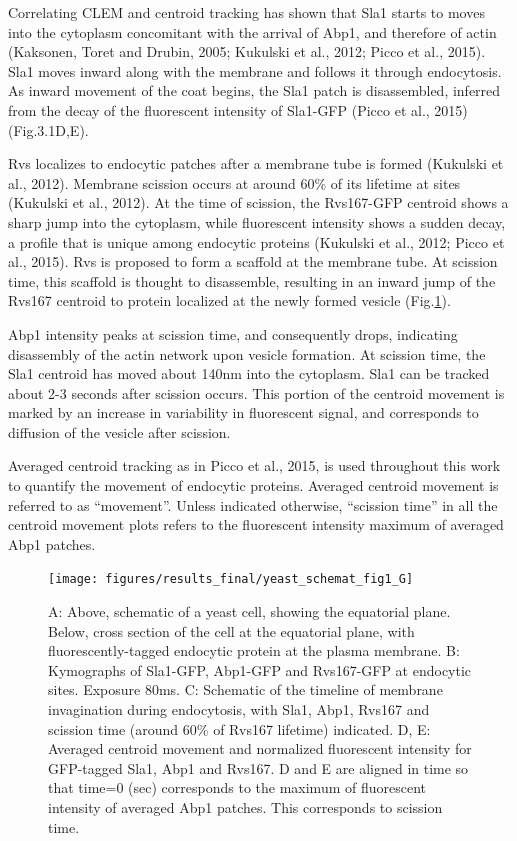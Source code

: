 \vspace{5mm}
Correlating CLEM and centroid tracking has shown that Sla1 starts to moves into the cytoplasm concomitant with the arrival of Abp1, and therefore of actin (Kaksonen, Toret and Drubin, 2005; Kukulski et al., 2012; Picco et al., 2015). Sla1 moves inward along with the membrane and follows it through endocytosis. As inward movement of the coat begins, the Sla1 patch is disassembled, inferred from the decay of the fluorescent intensity of Sla1-GFP (Picco et al., 2015) (Fig.3.1D,E). 

Rvs localizes to endocytic patches after a membrane tube is formed (Kukulski et al., 2012). Membrane scission occurs at around 60\% of its lifetime at sites (Kukulski et al., 2012). At the time of scission, the Rvs167-GFP centroid shows a sharp jump into the cytoplasm, while fluorescent intensity shows a sudden decay, a profile that is unique among endocytic proteins (Kukulski et al., 2012; Picco et al., 2015). Rvs is proposed to form a scaffold at the membrane tube. At scission time, this scaffold is thought to disassemble, resulting in an inward jump of the Rvs167 centroid to protein localized at the newly formed vesicle (Fig.\ref{fig1_schematic}). 

Abp1 intensity peaks at scission time, and consequently drops, indicating disassembly of the actin network upon vesicle formation. At scission time, the Sla1 centroid has moved about 140nm into the cytoplasm. Sla1 can be tracked about 2-3 seconds after scission occurs. This portion of the centroid movement is marked by an increase in variability in fluorescent signal, and corresponds to diffusion of the vesicle after scission.


\vspace{5mm}
Averaged centroid tracking as in Picco et al., 2015, is used throughout this work to quantify the movement of endocytic proteins. Averaged centroid movement is referred to as “movement”. Unless indicated otherwise, “scission time” in all the centroid movement plots refers to the fluorescent intensity maximum of averaged Abp1 patches.


	\begin{figure}[H]
	\centering
	\hspace*{-1.8cm}%
	\texttt{[image: figures/results\_final/yeast\_schemat\_fig1\_G]}
	\caption[Tracking yeast endocytic proteins]
	{A: Above, schematic of a yeast cell, showing the equatorial plane. Below, cross section of the cell at the equatorial plane, with fluorescently-tagged endocytic protein at the plasma membrane. 
B: Kymographs of Sla1-GFP, Abp1-GFP and Rvs167-GFP at endocytic sites. Exposure 80ms.
C: Schematic of the timeline of membrane invagination during endocytosis, with Sla1, Abp1, Rvs167 and scission time (around 60\% of Rvs167 lifetime) indicated. 
D, E: Averaged centroid movement and normalized fluorescent intensity for GFP-tagged Sla1, Abp1 and Rvs167. D and E are aligned in time so that time=0 (sec) corresponds to the maximum of fluorescent intensity of averaged Abp1 patches. This corresponds to scission time.
	\label{fig1_schematic}}
	\end{figure}



